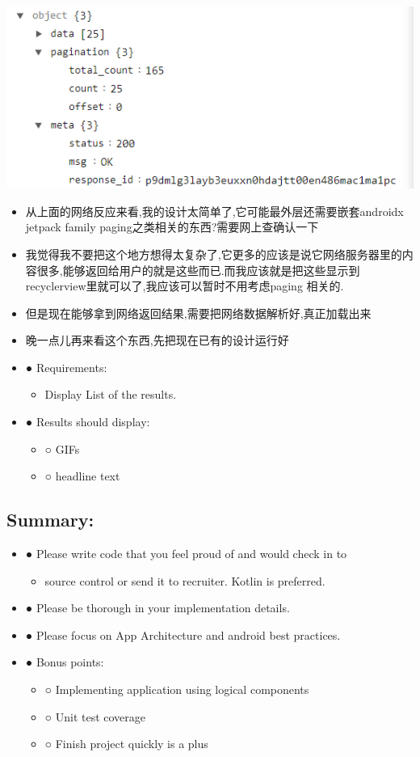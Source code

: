 \documentclass[9pt, b5paper]{article}
\begin{document}
\includegraphics[width=.9\linewidth]{./pic/readme_20221128_194628.png}
\begin{itemize}
\item 从上面的网络反应来看,我的设计太简单了,它可能最外层还需要嵌套androidx jetpack family paging之类相关的东西?需要网上查确认一下
\item 我觉得我不要把这个地方想得太复杂了,它更多的应该是说它网络服务器里的内容很多,能够返回给用户的就是这些而已.而我应该就是把这些显示到recyclerview里就可以了,我应该可以暂时不用考虑paging 相关的.
\item 但是现在能够拿到网络返回结果,需要把网络数据解析好,真正加载出来
\item 晚一点儿再来看这个东西,先把现在已有的设计运行好
\item ● Requirements:
\begin{itemize}
\item Display List of the results.
\end{itemize}
\item ● Results should display:
\begin{itemize}
\item ○ GIFs
\item ○ headline text
\end{itemize}
\end{itemize}
\subsection{Summary:}
\label{sec-2-2}
\begin{itemize}
\item ● Please write code that you feel proud of and would check in to
\begin{itemize}
\item source control or send it to recruiter. Kotlin is preferred.
\end{itemize}
\item ● Please be thorough in your implementation details.
\item ● Please focus on App Architecture and android best practices.
\item ● Bonus points:
\begin{itemize}
\item ○ Implementing application using logical components
\item ○ Unit test coverage
\item ○ Finish project quickly is a plus
\end{itemize}
\end{itemize}
\end{document}
